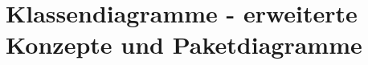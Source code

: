 \chapter{Klassendiagramme - erweiterte Konzepte und Paketdiagramme}



\newpage


\newpage


\newpage


